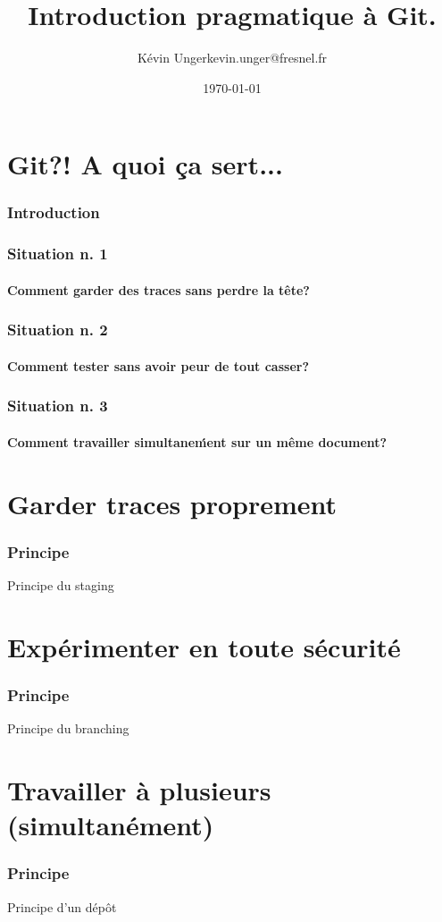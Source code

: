 \documentclass[t]{beamer}
\author{Kévin Unger\newline kevin.unger@fresnel.fr}
\date{\today}
\title{Introduction pragmatique à Git.}
\begin{document}
\section{Git?! A quoi ça sert...}
\frame{\titlepage}
\begin{frame}[label=intro]
        \frametitle{Introduction}
\end{frame}


\begin{frame}[label=sit1]
        \frametitle{Situation n. 1}
        \framesubtitle{Comment garder des traces sans perdre la tête?}
\end{frame}


\begin{frame}[label=sit2]
        \frametitle{Situation n. 2}
        \framesubtitle{Comment tester sans avoir peur de tout casser?}
\end{frame}


\begin{frame}[label=sit3]
        \frametitle{Situation n. 3}
        \framesubtitle{Comment travailler simultane\'ment sur un même document?}
\end{frame}

\section{Garder traces proprement}
\begin{frame}
        \frametitle{Principe}
        Principe du staging
\end{frame}

\section{Exp\'erimenter en toute s\'ecurit\'e}
\begin{frame}
        \frametitle{Principe}
        Principe du branching
\end{frame}

\section{Travailler \`a plusieurs (simultan\'ement) }
\begin{frame}
        \frametitle{Principe}
        Principe d'un d\'ep\^ot
\end{frame}
\end{document}
